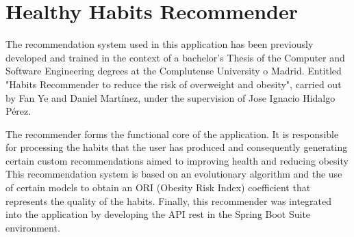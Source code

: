 \section*{Healthy Habits Recommender}

The recommendation system used in this application has been previously developed and trained in the context of a bachelor's Thesis of the Computer and Software Engineering degrees at the Complutense University o Madrid. Entitled "Habits Recommender to reduce the risk of overweight and obesity", carried out by Fan Ye and Daniel Martínez, under the supervision
of Jose Ignacio Hidalgo Pérez.

The recommender forms the functional core of the application. It is
responsible for processing the habits that the user has produced and
consequently generating certain custom recommendations aimed to improving
health and reducing obesity
This recommendation system is based on an evolutionary algorithm and the
use of certain models to obtain an ORI (Obesity Risk Index) coefficient
that represents the quality of the habits.
Finally, this recommender was integrated into the application by
developing the API rest in the Spring Boot Suite environment.

